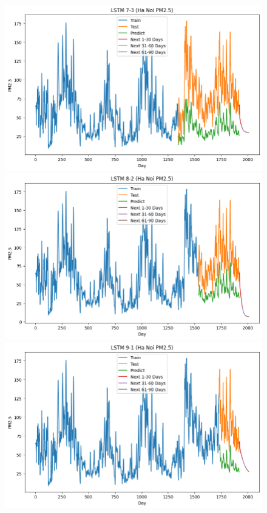 \begin{figure}[H]
{\begin{adjustbox}{minipage=0.48\textwidth}
\begin{minipage}{0.3\textwidth}
            \end{minipage}\hfill
            \begin{minipage}{0.3\textwidth}
                \centering
                \includegraphics[width=\textwidth]{img/final/LSTM/90D/LSTM_7_3_HN.png}\\
                \includegraphics[width=\textwidth]{img/final/LSTM/90D/LSTM_8_2_HN.png}\\
                \includegraphics[width=\textwidth]{img/final/LSTM/90D/LSTM_9_1_HN.png}

\end{minipage}
\end{adjustbox}}
\end{figure}
